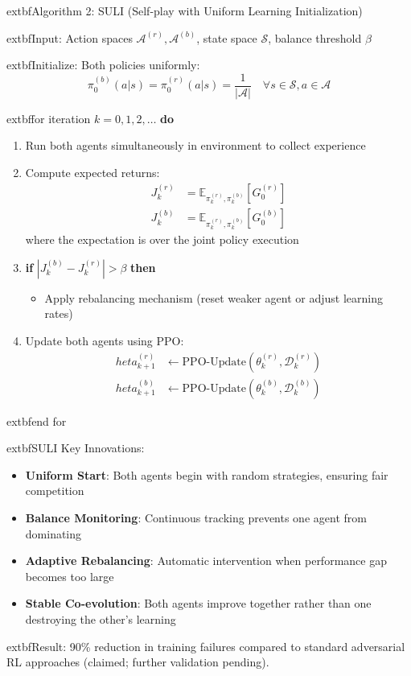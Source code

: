 \documentclass[11pt]{article}
\begin{document}
\begin{mathdetails}
	extbf{Algorithm 2: SULI (Self-play with Uniform Learning Initialization)}

	extbf{Input:} Action spaces $\mathcal{A}^{(r)}, \mathcal{A}^{(b)}$, state space $\mathcal{S}$, balance threshold $\beta$

	extbf{Initialize:} Both policies uniformly:
$$\pi_0^{(b)}(a|s) = \pi_0^{(r)}(a|s) = \frac{1}{|\mathcal{A}|} \quad \forall s \in \mathcal{S}, a \in \mathcal{A}$$

	extbf{for} iteration $k = 0, 1, 2, \ldots$ \textbf{do}
\begin{enumerate}
\item Run both agents simultaneously in environment to collect experience
\item Compute expected returns:
   \begin{align}
   J^{(r)}_k &= \mathbb{E}_{\pi_k^{(r)}, \pi_k^{(b)}}[G_0^{(r)}] \\
   J^{(b)}_k &= \mathbb{E}_{\pi_k^{(r)}, \pi_k^{(b)}}[G_0^{(b)}]
   \end{align}
   where the expectation is over the joint policy execution

\item \textbf{if} $|J^{(b)}_k - J^{(r)}_k| > \beta$ \textbf{then}
   \begin{itemize}
   \item Apply rebalancing mechanism (reset weaker agent or adjust learning rates)
   \end{itemize}

\item Update both agents using PPO:
   \begin{align}
   	heta_{k+1}^{(r)} &\leftarrow \text{PPO-Update}(\theta_k^{(r)}, \mathcal{D}_k^{(r)}) \\
   	heta_{k+1}^{(b)} &\leftarrow \text{PPO-Update}(\theta_k^{(b)}, \mathcal{D}_k^{(b)})
   \end{align}
\end{enumerate}
	extbf{end for}
\end{mathdetails}

\begin{example}
	extbf{SULI Key Innovations}:
\begin{itemize}
\item \textbf{Uniform Start}: Both agents begin with random strategies, ensuring fair competition
\item \textbf{Balance Monitoring}: Continuous tracking prevents one agent from dominating
\item \textbf{Adaptive Rebalancing}: Automatic intervention when performance gap becomes too large
\item \textbf{Stable Co-evolution}: Both agents improve together rather than one destroying the other's learning
\end{itemize}

	extbf{Result}: 90\% reduction in training failures compared to standard adversarial RL approaches (claimed; further validation pending).
\end{example}
\end{document}
